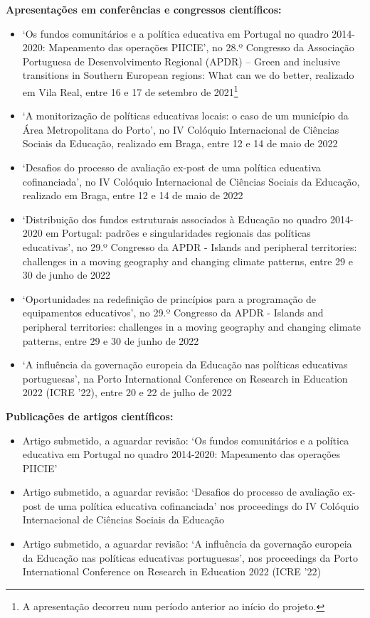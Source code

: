\documentclass[
]{book}
\begin{document}
\textbf{Apresentações em conferências e congressos científicos:}

\begin{itemize}
\item
  `Os fundos comunitários e a política educativa em Portugal no quadro 2014-2020: Mapeamento das operações PIICIE', no 28.º Congresso da Associação Portuguesa de Desenvolvimento Regional (APDR) -- Green and inclusive transitions in Southern European regions: What can we do better, realizado em Vila Real, entre 16 e 17 de setembro de 2021\footnote{A apresentação decorreu num período anterior ao início do projeto.}
\item
  `A monitorização de políticas educativas locais: o caso de um município da Área Metropolitana do Porto', no IV Colóquio Internacional de Ciências Sociais da Educação, realizado em Braga, entre 12 e 14 de maio de 2022
\item
  `Desafios do processo de avaliação ex-post de uma política educativa cofinanciada', no IV Colóquio Internacional de Ciências Sociais da Educação, realizado em Braga, entre 12 e 14 de maio de 2022
\item
  `Distribuição dos fundos estruturais associados à Educação no quadro 2014-2020 em Portugal: padrões e singularidades regionais das políticas educativas', no 29.º Congresso da APDR - Islands and peripheral territories: challenges in a moving geography and changing climate patterns, entre 29 e 30 de junho de 2022
\item
  `Oportunidades na redefinição de princípios para a programação de equipamentos educativos', no 29.º Congresso da APDR - Islands and peripheral territories: challenges in a moving geography and changing climate patterns, entre 29 e 30 de junho de 2022
\item
  `A influência da governação europeia da Educação nas políticas educativas portuguesas', na Porto International Conference on Research in Education 2022 (ICRE '22), entre 20 e 22 de julho de 2022
\end{itemize}

\textbf{Publicações de artigos científicos:}

\begin{itemize}
\item
  Artigo submetido, a aguardar revisão: `Os fundos comunitários e a política educativa em Portugal no quadro 2014-2020: Mapeamento das operações PIICIE'
\item
  Artigo submetido, a aguardar revisão: `Desafios do processo de avaliação ex-post de uma política educativa cofinanciada' nos proceedings do IV Colóquio Internacional de Ciências Sociais da Educação
\item
  Artigo submetido, a aguardar revisão: `A influência da governação europeia da Educação nas políticas educativas portuguesas', nos proceedings da Porto International Conference on Research in Education 2022 (ICRE '22)
\end{itemize}
\end{document}
